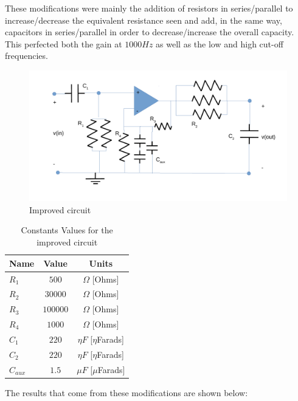These modifications were mainly the addition of resistors in series/parallel to increase/decrease the equivalent resistance seen and add, in the same way, capacitors in series/parallel in order to decrease/increase the overall capacity. This perfected both the gain at $1000 Hz$ as well as the low and high cut-off frequencies.   

\begin{figure}[h]
    \centering
    \includegraphics[scale=0.4]{circuitl5_new.pdf}
    \caption{Improved circuit}
    \label{fig:new_circuit}
\end{figure}

\clearpage

\begin{table}[h]
    \centering
    \begin{tabular}{|l|c|c|}
    \hline
    {\bf Name} & {\bf Value} & {\bf Units} \\ \hline
    $R_1$ & $500$ & $\Omega$ [Ohms] \\ \hline
    $R_2$ & $30000$ & $\Omega$ [Ohms] \\ \hline
    $R_3$ & $100000$ & $\Omega$ [Ohms] \\ \hline
    $R_4$ & $1000$ & $\Omega$ [Ohms] \\ \hline
    $C_1$ & $220$ & $\eta F$ [$\eta$Farads]\\ \hline
    $C_2$ & $220$ & $\eta F$ [$\eta$Farads] \\ \hline
    $C_{aux}$ & $1.5$ & $\mu F$ [$\mu$Farads]\\ \hline
    \end{tabular}
    \caption[Constants Values for the improved circuit]{Constants Values \footnotemark for the improved circuit}
    \label{tab:constants_new}
\end{table}
The results that come from these modifications are shown below:

